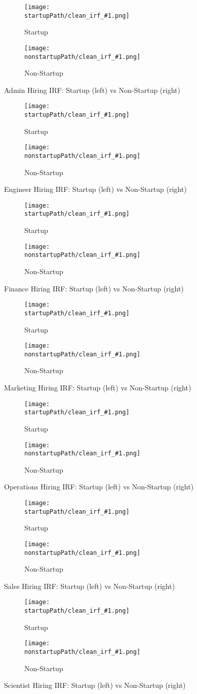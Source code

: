 \documentclass[11pt]{article}
\begin{document}
\newcommand{\startupPath}{../results/composition_irfs_all7_startup}
\newcommand{\nonstartupPath}{../results/composition_irfs_all7_nonstartup}

\newcommand{\RoleFigure}[2]{%
  \begin{figure}[H]
    \centering
    \begin{subfigure}[t]{0.48\textwidth}
      \centering
      \texttt{[image: \\startupPath/clean\_irf\_\#1.png]}
      \caption{Startup}
    \end{subfigure}\hfill
    \begin{subfigure}[t]{0.48\textwidth}
      \centering
      \texttt{[image: \\nonstartupPath/clean\_irf\_\#1.png]}
      \caption{Non-Startup}
    \end{subfigure}
    \caption{#2 Hiring IRF: Startup (left) vs Non-Startup (right)}
  \end{figure}
}

\RoleFigure{Admin}{Admin}
\RoleFigure{Engineer}{Engineer}
\RoleFigure{Finance}{Finance}
\RoleFigure{Marketing}{Marketing}
\RoleFigure{Operations}{Operations}
\RoleFigure{Sales}{Sales}
\RoleFigure{Scientist}{Scientist}
\end{document}
